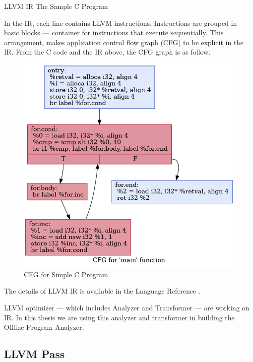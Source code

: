 \begin{listing}
\inputminted[]{llvm}{code/sample.ll}
\caption{LLVM IR The Sample C Program}    
\label{listing:2-2}
\end{listing}

In the IR, each line contains LLVM instructions. Instructions are grouped in basic blocks — container for instructions that execute sequentially. This arrangement, makes application control flow graph (CFG) to be explicit in the IR. From the C code and the IR above, the CFG graph is as follow.

\begin{figure}[htbp]
\centerline{\includegraphics[scale=.5]{Figures/cfg.png}}
\caption{CFG for Simple C Program}
\label{fig:2-1}
\end{figure}

The details of LLVM IR is available in the Language Reference \cite{LLVMLanguageReferencea}.

LLVM optimizer — which includes Analyzer and Transformer — are working on IR. In this thesis we are using this analyzer and transformer in building the Offline Program Analyzer.

\subsection{LLVM Pass}

